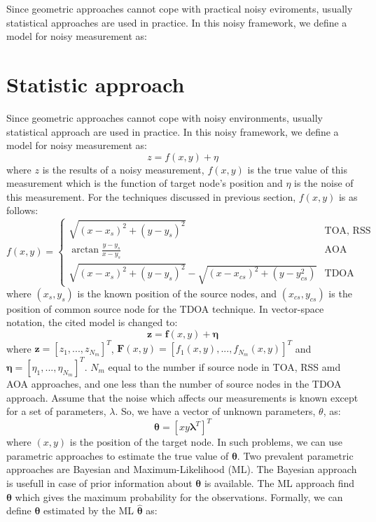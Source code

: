 \documentclass[../templatetop.tex]{subfiles}
\begin{document}
Since geometric approaches cannot cope with practical noisy eviroments, usually statistical approaches are used in practice. In this noisy framework, we define a model for noisy measurement as:

\section{Statistic approach}
Since geometric approaches cannot cope with noisy environments, usually statistical approach are used in practice. In this noisy framework, we define a model for noisy measurement as:
\begin{equation}
    z = f(x,y) + \eta
\end{equation}
where $z$ is the results of a noisy measurement, $f(x,y)$ is the true value of this measurement which is the function of target node's position and $\eta$ is the noise of this measurement. For the techniques discussed in previous section, $f(x,y)$ is as follows:
\begin{equation}
    f(x,y) = \begin{cases} \sqrt{(x-x_s)^2 + (y-y_s)^2} & \mbox{TOA, RSS} 
    \\ \arctan{\frac{y-y_s}{x-y_s}} & \mbox{AOA}
    \\ \sqrt{(x-x_s)^2 + (y-y_s)^2} - \sqrt{(x-x_{cs})^2 + (y-y_{cs}^2)} & \mbox{TDOA}
\end{cases}
\end{equation}
where $(x_s,y_s)$ is the known position of the source nodes, and $(x_{cs},y_{cs})$ is the position of common source node for the TDOA technique. In vector-space notation, the cited model is changed to:
\begin{equation}
    \mathbf{z} = \mathbf{f}(x,y) + \mathbf{\eta}
\end{equation}
where $\mathbf{z} = [z_1,...,z_{N_m}]^T$, $\mathbf{F}(x,y) = [f_1(x,y),...,f_{N_m}(x,y)]^T$ and $\mathbf{\eta}=[\eta_1,...,\eta_{N_m}]^T$. $N_m$ equal to the number if source node in TOA, RSS amd AOA approaches, and one less than the number of source nodes in the TDOA approach. Assume that the noise which affects our measurements is known except for a set of parameters, $\lambda$. So, we have a vector of unknown parameters, $\theta$, as:
\begin{equation}
    \mathbf{\theta} = [xy\mathbf{\lambda}^T]^T
\end{equation}
where $(x,y)$ is the position of the target node. In such problems, we can use parametric approaches to estimate the  true value of $\mathbf{\theta}$. Two prevalent parametric approaches are Bayesian and Maximum-Likelihood (ML). The Bayesian approach is usefull in case of prior information about $\mathbf{\theta}$ is available. The ML approach find $\mathbf{\theta}$ which gives the maximum probability for the observations. Formally, we can define $\mathbf{\theta}$ estimated by the ML $\hat{\mathbf{\theta}}$ as:
\end{document}
